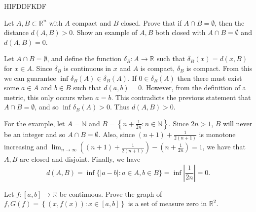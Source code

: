 
HIFDDFKDF
\begin{problem}{1}
  Let $A,B \subset \mathbb{R}^{n}$ with $A$ compact and $B$ closed. Prove that if $A \cap B = \emptyset$, then the distance $d(A,B) > 0$.
  Show an example of $A,B$ both closed with $A \cap B = \emptyset$ and $d(A,B) = 0$.
\end{problem} 

\begin{solution}

  Let $A \cap B = \emptyset$, and define the function $ \delta_{B} : A \to \mathbb{R}^{} $ such that $\delta_{B}(x) = d(x,B)$ for $x \in A$.
  Since $\delta_{B}$ is continuous in $x$ and $A$ is compact, $\delta_{B}$ is compact.
  From this we can guarantee $\inf_{}\delta_{B}(A) \in \delta_{B}(A)$.
  If $0 \in \delta_{B}(A)$ then there must exist some $a \in A$ and $b \in B$ such that $d(a,b) = 0$.
  However, from the definition of a metric, this only occurs when $a = b$.
  This contradicts the previous statement that $A \cap B = \emptyset$, and so $ \inf_{}\delta_{B}(A) > 0$.
  Thus $d(A,B) > 0$.

  For the example, let $A = \mathbb{N}$ and $B = \left\{ n + \frac{1}{2n} : n \in \mathbb{N} \right\}$.
  Since $2n > 1$, $B$ will never be an integer and so $A \cap B = \emptyset$.
  Also, since $(n+1) + \frac{1}{2(n+1)}$ is monotone increasing and $\lim_{n\to \infty} ((n+1) + \frac{1}{2(n+1)}) - (n + \frac{1}{2n}) = 1$, we have that $A,B$ are closed and disjoint.
  Finally, we have
  \[
  d(A,B) = \inf\{\left| a - b \right| : a \in A, b \in B\} = \inf\left| \frac{1}{2n} \right| = 0
  .\] 

\end{solution}

\pagebreak

\begin{problem}{2}
  Let $ f : [a,b] \to \mathbb{R}^{} $ be continuous. Prove the graph of $f, G(f) = \left\{ (x,f(x)) : x \in [a,b] \right\}$ is a set of measure zero in $\mathbb{R}^{2}$.
\end{problem}
    
